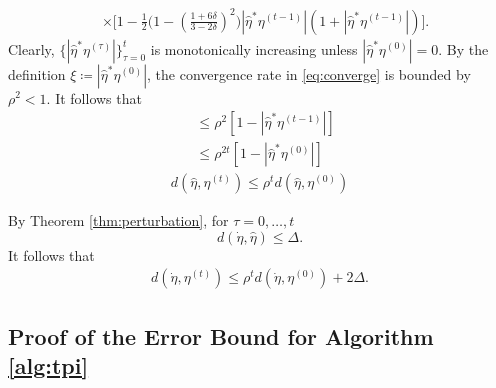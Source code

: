 \documentclass[11pt,journal]{IEEEtran}
\begin{document}
\begin{IEEEproof}
\begin{align}
& \times \Big[ 1 - \frac{1}{2} \bigl(1-(\frac{1+6\delta}{3-2\delta})^2\bigr)|\hat{\eta}^*\eta^{(t-1)}|(1 + |\hat{\eta}^*\eta^{(t-1)}|) \Big]. \label{eq:converge}
\end{align}
Clearly, $\{ |\hat{\eta}^*\eta^{(\tau)}| \}_{\tau = 0}^t$ is monotonically increasing unless $|\hat{\eta}^*\eta^{(0)}| = 0$. By the definition $\xi \coloneqq |\hat{\eta}^*\eta^{(0)}| $, the convergence rate in \eqref{eq:converge} is bounded by $\rho^2 < 1$. It follows that
\begin{align*}
[1 - |\hat{\eta}^*\eta^{(t)}|] & \leq \rho^2[1 - |\hat{\eta}^*\eta^{(t-1)}|] \\
& \leq \rho^{2t} [1 - |\hat{\eta}^*\eta^{(0)}|]
\end{align*}
\begin{align*}
d(\hat{\eta}, \eta^{(t)}) \leq \rho^t
d(\hat{\eta}, \eta^{(0)})
\end{align*}

By Theorem \ref{thm:perturbation}, for $\tau = 0,\dots, t$
\[
d(\dot{\eta}, \hat{\eta}) \leq \Delta.
\]
It follows that
\begin{align*}
d(\dot{\eta}, \eta^{(t)}) \leq \rho^t
d(\dot{\eta}, \eta^{(0)}) + 2\Delta.
\end{align*}
\end{IEEEproof}




\subsection{Proof of the Error Bound for Algorithm \ref{alg:tpi}}
\end{document}

